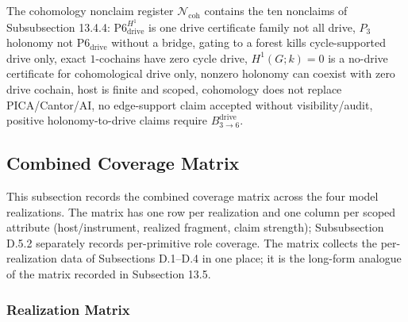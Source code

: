 \documentclass[11pt]{article}
\theoremstyle{definition}
\begin{document}
The cohomology nonclaim register \(\mathcal N_{\mathrm{coh}}\) contains the ten nonclaims of Subsubsection 13.4.4: \(\mathrm{P6}_{\mathrm{drive}}^{H^{1}}\) is one drive certificate family not all drive, \(P_{3}\) holonomy not \(\mathrm{P6}_{\mathrm{drive}}\) without a bridge, gating to a forest kills cycle-supported drive only, exact \(1\)-cochains have zero cycle drive, \(H^{1}(G;k)=0\) is a no-drive certificate for cohomological drive only, nonzero holonomy can coexist with zero drive cochain, host is finite and scoped, cohomology does not replace PICA/Cantor/AI, no edge-support claim accepted without visibility/audit, positive holonomy-to-drive claims require \(B_{3\to 6}^{\mathrm{drive}}\).

\subsection{Combined Coverage Matrix}

This subsection records the combined coverage matrix across the four model realizations. The matrix has one row per realization and one column per scoped attribute (host/instrument, realized fragment, claim strength); Subsubsection D.5.2 separately records per-primitive role coverage. The matrix collects the per-realization data of Subsections D.1--D.4 in one place; it is the long-form analogue of the matrix recorded in Subsection 13.5.

\subsubsection{Realization Matrix}
\end{document}
